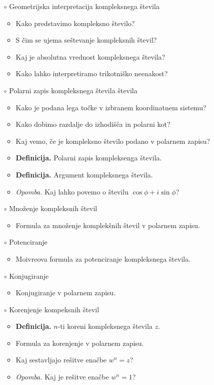 \begin{enumerate}
    \item[$\circ$] Geometrijska interpretacija kompleksnega števila
    \begin{itemize}
        \item Kako predstavimo kompleksno število?
        \item S čim se ujema seštevanje kompleksnih števil?
        \item Kaj je absolutna vrednost kompleksnega števila?
        \item Kako lahko interpretiramo trikotniško neenakost?
    \end{itemize}
    \item[$\circ$] Polarni zapis kompleksnega števila števila
    \begin{itemize}
        \item Kako je podana lega točke v izbranem koordinatnem sistemu?
        \item Kako dobimo razdalje do izhodišča in polarni kot?
        \item Kaj vemo, če je kompleksno število podano v polarnem zapisu? 
        \item \colorbox{purple!30}{\textbf{Definicija.}} Polarni zapis kompleksenga števila. 
        \item \colorbox{purple!30}{\textbf{Definicija.}} Argument kompleksnega števila.
        \item \colorbox{yellow!30}{\emph{Opomba.}} Kaj lahko povemo o številu $\cos \phi + i \sin \phi$?
    \end{itemize}

    \item[$\circ$] Množenje kompleksnih števil
    \begin{itemize}
        \item Formula za množenje komplekšnih števil v polarnem zapisu.
    \end{itemize}

    \item[$\circ$] Potenciranje
    \begin{itemize}
        \item Moivreova formula za potenciranje kompleksnega števila.
    \end{itemize}

    \item[$\circ$] Konjugiranje
    \begin{itemize}
        \item Konjugiranje v polarnem zapisu.
    \end{itemize}

    \item[$\circ$] Korenjenje kompeksnih števil
    \begin{itemize}
        \item \colorbox{purple!30}{\textbf{Definicija.}} $n$-ti koreni kompleksnega števila $z$.
        \item Formula za korenjenje v polarnem zapisu.
        \item Kaj sestavljajo rešitve enačbe $w^n = z$?
        \item \colorbox{yellow!30}{\emph{Opomba.}} Kaj je rešitve enačbe $w^n = 1$?
    \end{itemize}
\end{enumerate}